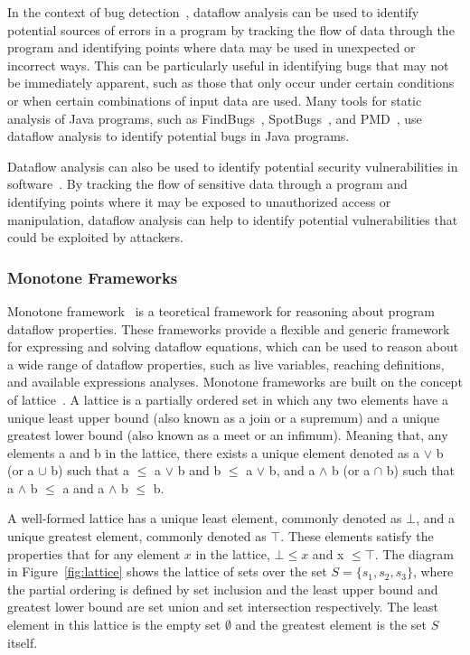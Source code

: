 In the context of bug detection~\cite{spoon, fink2012wala}, dataflow analysis can be used to identify
potential sources of errors in a program by tracking the flow of data through
the program and identifying points where data may be used in unexpected or
incorrect ways. This can be particularly useful in identifying bugs that may
not be immediately apparent, such as those that only occur under certain
conditions or when certain combinations of input data are used.
Many tools for static analysis of Java programs, such as FindBugs~\cite{findbugs},
SpotBugs~\cite{spotbugs}, and PMD~\cite{copeland2005pmd}, use dataflow analysis to identify
potential bugs in Java programs.

Dataflow analysis can also be used to identify potential security vulnerabilities
in software~\cite{flowDroid,piskachev2021secucheck,lawall10coccinelle}. By tracking the flow of sensitive data through a program and
identifying points where it may be exposed to unauthorized access or manipulation,
dataflow analysis can help to identify potential vulnerabilities that could be
exploited by attackers.

\subsubsection*{Monotone Frameworks}
Monotone framework~\cite{kam1977monotone} is a teoretical framework for reasoning about program dataflow properties.
These frameworks provide a flexible and generic framework for expressing and solving
dataflow equations, which can be used to reason about a wide range of dataflow 
properties, such as live variables, reaching definitions, and available expressions analyses.
Monotone frameworks are built on the concept of lattice~\cite{Donnellan1968,Birkhoff1967,cousot1977ai}. 
A lattice is a partially ordered set in which any two elements have a unique least 
upper bound (also known as a join or a supremum) and a unique greatest lower bound 
(also known as a meet or an infimum). Meaning that, any elements a and b in 
the lattice, there exists a unique element denoted as a $\vee$ b (or a $\cup$ b) 
such that a $\leq$ a $\vee$ b and b $\leq$ a $\vee$ b, and a $\wedge$ b 
(or a $\cap$ b) such that a $\wedge$ b $\leq$ a and a $\wedge$ b $\leq$ b.

A well-formed lattice has a unique least element, commonly denoted as $\bot$, 
and a unique greatest element, commonly denoted as $\top$. These elements satisfy 
the properties that for any element $x$ in the lattice, $\bot \leq x$ and x $\leq \top$.
The diagram in Figure~\ref{fig:lattice} shows the lattice of sets over the set
$S = \{s_1, s_2, s_3\}$, where the partial ordering is defined by set inclusion
and the least upper bound and greatest lower bound are set union and set intersection
respectively. The least element in this lattice is the empty set $\emptyset$ and the
greatest element is the set $S$ itself. 

